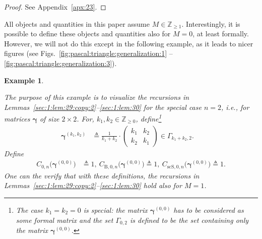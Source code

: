 \documentclass[journal,lettersize,twocolumn]{IEEEtran} %
\newtheorem{example}[theorem]{Example}
\newcommand{\vect}[1]{ \bm{#1} }
\newcommand{\vgam}{ \vect{\gamma} }
\newcommand{\sZ}{\mathbb{Z}}
\newcommand{\defeq}{ \triangleq }
\newcommand{\Cgen}[2]{C_{#1,#2}}
\newcommand{\CBgen}[2]{C_{\mathrm{B},#1,#2}}
\newcommand{\CscSgen}[2]{C_{\mathrm{scS},#1,#2}}
\newcommand{\ie}{\textit{i.e.}}
\begin{document}
%

\begin{proof}
  See Appendix~\ref{apx:23}.
\end{proof}

%

All objects and quantities in this paper assume $M \in \sZ_{\geq
  1}$. Interestingly, it is possible to define these objects and quantities
also for $M = 0$, at least formally. However, we will not do this except in
the following example, as it leads to nicer figures (see
Figs.~\ref{fig:pascal:triangle:generalization:1}%
--\ref{fig:pascal:triangle:generalization:3}).

%

\begin{example}
  \label{example:pascal:triangle:generalization:1}

  The purpose of this example is to visualize the recursions in
  Lemmas~\ref{sec:1:lem:29:copy:2}--\ref{sec:1:lem:30} for the special case
  $n = 2$, \ie, for matrices $\vgam$ of size $2 \times 2$. For,
  $k_1, k_2 \in \sZ_{\geq 0}$, define\footnote{The case $k_1 = k_2 = 0$ is
    special: the matrix $\vgam^{(0,0)}$ has to be considered as some formal
    matrix and the set $\Gamma_{0,2}$ is defined to be the set containing only
    the matrix $\vgam^{(0,0)}$.}
  \begin{align*}
    \vgam^{(k_1,k_2)}
      &\defeq
         \frac{1}{k_1 + k_2} 
         \cdot
         \begin{pmatrix}
           k_1 & k_2 \\
           k_2 & k_1
         \end{pmatrix}
           \in \Gamma_{k_1+k_2,2}.
             \quad
  \end{align*}
  Define
  \begin{align*}
    \Cgen{0}{n}\bigl( \vgam^{(0,0)} \bigr)
      &\defeq
         1, \ 
    \CBgen{0}{n}\bigl( \vgam^{(0,0)} \bigr)
       \defeq
         1, \ 
    \CscSgen{0}{n}\bigl( \vgam^{(0,0)} \bigr)
       \defeq
         1.
  \end{align*}
  One can the verify that with these definitions, the recursions in
  Lemmas~\ref{sec:1:lem:29:copy:2}--\ref{sec:1:lem:30} hold also for $M = 1$.

%


\end{example}
\end{document}
